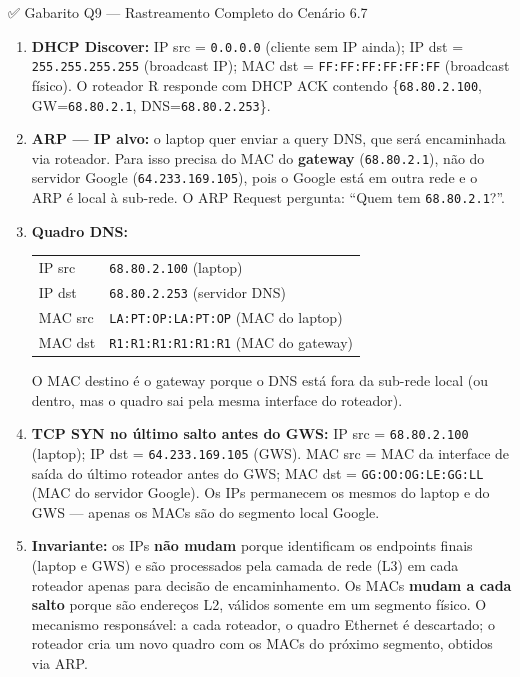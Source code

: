 \documentclass[11pt,a4paper]{article}
\begin{document}
\begin{gabaritocaixa}{✅ Gabarito Q9 --- Rastreamento Completo do Cenário 6.7}
\begin{enumerate}[label=(\alph*)]
    \item \textbf{DHCP Discover:}
    IP src = \texttt{0.0.0.0} (cliente sem IP ainda);
    IP dst = \texttt{255.255.255.255} (broadcast IP);
    MAC dst = \texttt{FF:FF:FF:FF:FF:FF} (broadcast físico).
    O roteador R responde com DHCP ACK contendo \{\texttt{68.80.2.100}, GW=\texttt{68.80.2.1}, DNS=\texttt{68.80.2.253}\}.

    \item \textbf{ARP --- IP alvo:} o laptop quer enviar a query DNS, que será encaminhada via roteador. Para isso precisa do MAC do \textbf{gateway} (\texttt{68.80.2.1}), não do servidor Google (\texttt{64.233.169.105}), pois o Google está em outra rede e o ARP é local à sub-rede. O ARP Request pergunta: ``Quem tem \texttt{68.80.2.1}?''.

    \item \textbf{Quadro DNS:}
\begin{center}
\begin{tabular}{ll}
\toprule
IP src & \texttt{68.80.2.100} (laptop) \\
IP dst & \texttt{68.80.2.253} (servidor DNS) \\
MAC src & \texttt{LA:PT:OP:LA:PT:OP} (MAC do laptop) \\
MAC dst & \texttt{R1:R1:R1:R1:R1:R1} (MAC do gateway) \\
\bottomrule
\end{tabular}
\end{center}
O MAC destino é o gateway porque o DNS está fora da sub-rede local (ou dentro, mas o quadro sai pela mesma interface do roteador).

    \item \textbf{TCP SYN no último salto antes do GWS:}
    IP src = \texttt{68.80.2.100} (laptop); IP dst = \texttt{64.233.169.105} (GWS).
    MAC src = MAC da interface de saída do último roteador antes do GWS;
    MAC dst = \texttt{GG:OO:OG:LE:GG:LL} (MAC do servidor Google).
    Os IPs permanecem os mesmos do laptop e do GWS --- apenas os MACs são do segmento local Google.

    \item \textbf{Invariante:} os IPs \textbf{não mudam} porque identificam os endpoints finais (laptop e GWS) e são processados pela camada de rede (L3) em cada roteador apenas para decisão de encaminhamento. Os MACs \textbf{mudam a cada salto} porque são endereços L2, válidos somente em um segmento físico. O mecanismo responsável: a cada roteador, o quadro Ethernet é descartado; o roteador cria um novo quadro com os MACs do próximo segmento, obtidos via ARP.
\end{enumerate}
\end{gabaritocaixa}
\end{document}
